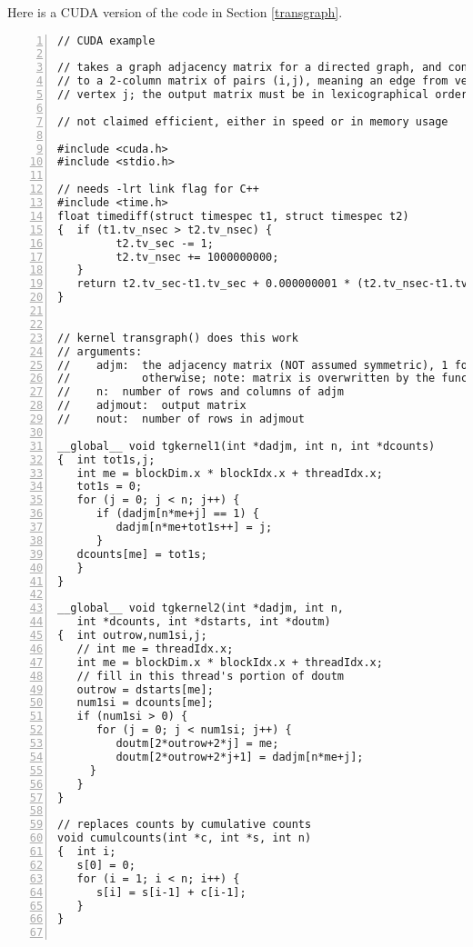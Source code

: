 Here is a CUDA version of the code in Section \ref{transgraph}.

\begin{lstlisting}[numbers=left]
// CUDA example

// takes a graph adjacency matrix for a directed graph, and converts it
// to a 2-column matrix of pairs (i,j), meaning an edge from vertex i to
// vertex j; the output matrix must be in lexicographical order

// not claimed efficient, either in speed or in memory usage

#include <cuda.h>
#include <stdio.h>

// needs -lrt link flag for C++
#include <time.h>
float timediff(struct timespec t1, struct timespec t2)
{  if (t1.tv_nsec > t2.tv_nsec) {
         t2.tv_sec -= 1;
         t2.tv_nsec += 1000000000;
   }
   return t2.tv_sec-t1.tv_sec + 0.000000001 * (t2.tv_nsec-t1.tv_nsec);
}


// kernel transgraph() does this work
// arguments:
//    adjm:  the adjacency matrix (NOT assumed symmetric), 1 for edge, 0
//           otherwise; note: matrix is overwritten by the function
//    n:  number of rows and columns of adjm
//    adjmout:  output matrix
//    nout:  number of rows in adjmout

__global__ void tgkernel1(int *dadjm, int n, int *dcounts)
{  int tot1s,j;
   int me = blockDim.x * blockIdx.x + threadIdx.x;
   tot1s = 0;
   for (j = 0; j < n; j++) {
      if (dadjm[n*me+j] == 1) {
         dadjm[n*me+tot1s++] = j;
      }
   dcounts[me] = tot1s;
   }
}

__global__ void tgkernel2(int *dadjm, int n, 
   int *dcounts, int *dstarts, int *doutm)
{  int outrow,num1si,j;
   // int me = threadIdx.x;
   int me = blockDim.x * blockIdx.x + threadIdx.x;
   // fill in this thread's portion of doutm
   outrow = dstarts[me];
   num1si = dcounts[me];
   if (num1si > 0) {
      for (j = 0; j < num1si; j++) {
         doutm[2*outrow+2*j] = me;
         doutm[2*outrow+2*j+1] = dadjm[n*me+j];
     }
   }
}

// replaces counts by cumulative counts
void cumulcounts(int *c, int *s, int n)
{  int i;
   s[0] = 0;
   for (i = 1; i < n; i++) {
      s[i] = s[i-1] + c[i-1];
   }
}


\end{lstlisting}
